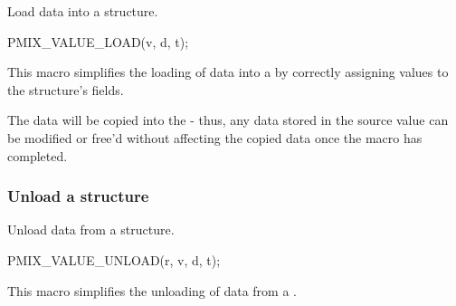 \summary

Load data into a  structure.

\cspecificstart
\begin{codepar}
PMIX_VALUE_LOAD(v, d, t);
\end{codepar}
\cspecificend

\begin{arglist}
\end{arglist}

\descr

This macro simplifies the loading of data into a  by correctly assigning values to the structure's fields.

\adviceuserstart
The data will be copied into the  - thus, any data stored in the source value can be modified or free'd without affecting the copied data once the macro has completed.
\adviceuserend

\subsubsection{Unload a  structure}

\summary

Unload data from a  structure.

\cspecificstart
\begin{codepar}
PMIX_VALUE_UNLOAD(r, v, d, t);
\end{codepar}
\cspecificend

\begin{arglist}
\end{arglist}

\descr

This macro simplifies the unloading of data from a .

